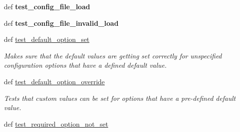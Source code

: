 \begin{DoxyCompactItemize}
\item 
\hypertarget{classhwm_1_1core_1_1tests_1_1test__configuration_1_1_test_configuration_a7ba6c7f4ece88a8adf0d268b2506caa0}{def {\bfseries test\-\_\-config\-\_\-file\-\_\-load}}\label{classhwm_1_1core_1_1tests_1_1test__configuration_1_1_test_configuration_a7ba6c7f4ece88a8adf0d268b2506caa0}

\item 
\hypertarget{classhwm_1_1core_1_1tests_1_1test__configuration_1_1_test_configuration_a1d5f214ee4f434d144f0695ab1ad0205}{def {\bfseries test\-\_\-config\-\_\-file\-\_\-invalid\-\_\-load}}\label{classhwm_1_1core_1_1tests_1_1test__configuration_1_1_test_configuration_a1d5f214ee4f434d144f0695ab1ad0205}

\item 
\hypertarget{classhwm_1_1core_1_1tests_1_1test__configuration_1_1_test_configuration_a668bcea24e6152d35e9132afdc5dd737}{def \hyperlink{classhwm_1_1core_1_1tests_1_1test__configuration_1_1_test_configuration_a668bcea24e6152d35e9132afdc5dd737}{test\-\_\-default\-\_\-option\-\_\-set}}\label{classhwm_1_1core_1_1tests_1_1test__configuration_1_1_test_configuration_a668bcea24e6152d35e9132afdc5dd737}

\begin{DoxyCompactList}\small\item\em Makes sure that the default values are getting set correctly for unspecified configuration options that have a defined default value. \end{DoxyCompactList}\item 
\hypertarget{classhwm_1_1core_1_1tests_1_1test__configuration_1_1_test_configuration_a14cfcee6ef411abba643eb4a7fc617f2}{def \hyperlink{classhwm_1_1core_1_1tests_1_1test__configuration_1_1_test_configuration_a14cfcee6ef411abba643eb4a7fc617f2}{test\-\_\-default\-\_\-option\-\_\-override}}\label{classhwm_1_1core_1_1tests_1_1test__configuration_1_1_test_configuration_a14cfcee6ef411abba643eb4a7fc617f2}

\begin{DoxyCompactList}\small\item\em Tests that custom values can be set for options that have a pre-\/defined default value. \end{DoxyCompactList}\item 
\hypertarget{classhwm_1_1core_1_1tests_1_1test__configuration_1_1_test_configuration_adcda0a611a1d0ce2957bfd3672366628}{def \hyperlink{classhwm_1_1core_1_1tests_1_1test__configuration_1_1_test_configuration_adcda0a611a1d0ce2957bfd3672366628}{test\-\_\-required\-\_\-option\-\_\-not\-\_\-set}}\label{classhwm_1_1core_1_1tests_1_1test__configuration_1_1_test_configuration_adcda0a611a1d0ce2957bfd3672366628}


\end{DoxyCompactItemize}
